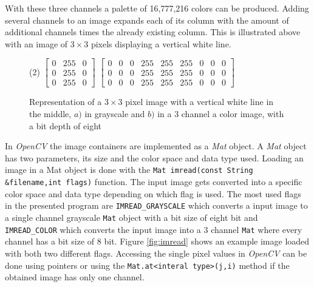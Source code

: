 With these three channels a palette of 16,777,216 colors can be produced. Adding several channels to an image expands each of its column with the amount of additional channels times the already existing column. This is illustrated above with an image of $3\times3$ pixels displaying a vertical white line.
\begin{figure}[h]
\begin{tasks}(2)
\task
$
\begin{bmatrix}
  0 & 255 & 0 \\ 
  0 & 255 & 0 \\
  0 & 255 & 0
\end{bmatrix}
$
\task
$
\begin{bmatrix}
  0 & 0 & 0 & 255 & 255 & 255 & 0 & 0 & 0 \\ 
  0 & 0 & 0 & 255 & 255 & 255 & 0 & 0 & 0 \\
  0 & 0 & 0 & 255 & 255 & 255 & 0 & 0 & 0
\end{bmatrix}
$
\end{tasks}
\caption{Representation of a $3\times3$ pixel image with a vertical white line in the middle, $a)$ in grayscale and $b)$ in a 3 channel a color image, with a bit depth of eight}
\end{figure}

\vspace{0.4cm}


In \textit{OpenCV} the image containers are implemented as a \textit{Mat} object. A \textit{Mat} object has two parameters, its  size and the color space and data type used. 
Loading an image in a Mat object is done with the \lstinline|Mat imread(const String &filename,int flags)| function. The input image gets converted into a specific color space and data type depending on which flag is used. The most used flags in the presented program are \lstinline|IMREAD_GRAYSCALE| which converts a input image to a single channel grayscale \lstinline|Mat| object with a bit size of eight bit and \lstinline|IMREAD_COLOR| which converts the input image into a 3 channel \lstinline|Mat| where every channel has a bit size of 8 bit. Figure \ref{fig:imread} shows an example image loaded with both two different flags.
Accessing the single pixel values in \textit{OpenCV} can be done using pointers or using the \lstinline|Mat.at<interal type>(j,i)| method if the obtained image has only one channel.

\newpage

